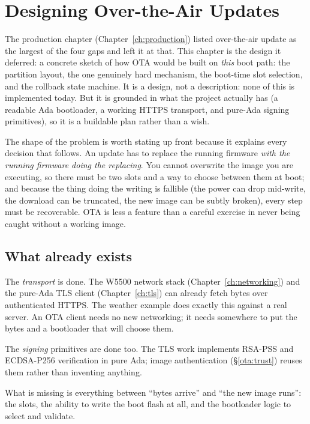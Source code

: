 \chapter{Designing Over-the-Air Updates}
\label{ch:ota}

The production chapter (Chapter~\ref{ch:production}) listed over-the-air update as
the largest of the four gaps and left it at that. This chapter is the design it
deferred: a concrete sketch of how OTA would be built on \emph{this} boot path:
the partition layout, the one genuinely hard mechanism, the boot-time slot
selection, and the rollback state machine. It is a design, not a description: none
of this is implemented today. But it is grounded in what the project actually has
(a readable Ada bootloader, a working HTTPS transport, and pure-Ada signing
primitives), so it is a buildable plan rather than a wish.

The shape of the problem is worth stating up front because it explains every
decision that follows. An update has to replace the running firmware \emph{with the
running firmware doing the replacing}. You cannot overwrite the image you are
executing, so there must be two slots and a way to choose between them at boot; and
because the thing doing the writing is fallible (the power can drop mid-write, the
download can be truncated, the new image can be subtly broken), every step must be
recoverable. OTA is less a feature than a careful exercise in never being caught
without a working image.

\section{What already exists}

The \emph{transport} is done. The W5500 network stack (Chapter~\ref{ch:networking})
and the pure-Ada TLS client (Chapter~\ref{ch:tls}) can already fetch bytes over
authenticated HTTPS. The weather example does exactly this against a real server.
An OTA client needs no new networking; it needs somewhere to put the bytes and a
bootloader that will choose them.

The \emph{signing} primitives are done too. The TLS work implements RSA-PSS and
ECDSA-P256 verification in pure Ada; image authentication (\S\ref{ota:trust}) reuses
them rather than inventing anything.

What is missing is everything between ``bytes arrive'' and ``the new image runs'':
the slots, the ability to write the boot flash at all, and the bootloader logic to
select and validate.

